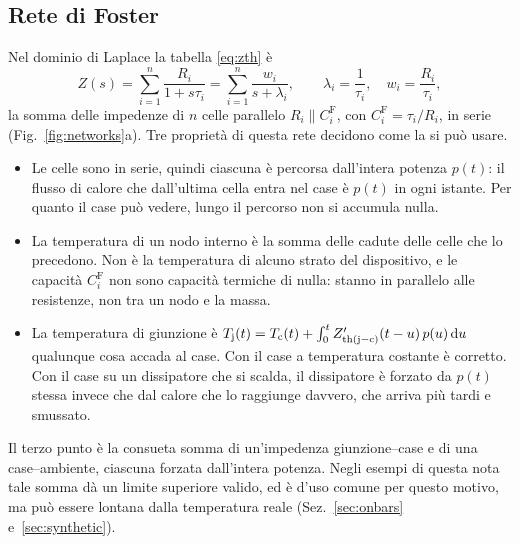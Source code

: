 \documentclass[10pt,a4paper]{scrartcl}
\let\newcommand\fcitdefine
\newcommand{\Zjc}{Z_\mathrm{th(j-c)}}
\newcommand{\Tj}{T_\mathrm{j}}
\newcommand{\Tc}{T_\mathrm{c}}
\newcommand{\diff}{\mathrm{d}}
\begin{document}
\subsection{Rete di Foster}
Nel dominio di Laplace la tabella \eqref{eq:zth} è
\begin{equation}
Z(s) = \sum_{i=1}^{n} \frac{R_i}{1 + s\tau_i} = \sum_{i=1}^{n} \frac{w_i}{s + \lambda_i} , \qquad \lambda_i = \frac{1}{\tau_i} , \quad w_i = \frac{R_i}{\tau_i} ,
\label{eq:zfoster}
\end{equation}
la somma delle impedenze di $n$ celle parallelo $R_i \parallel C_i^\mathrm{F}$, con $C_i^\mathrm{F} = \tau_i/R_i$, in serie (Fig.~\ref{fig:networks}a). Tre proprietà di questa rete decidono come la si può usare.
\begin{itemize}
\item Le celle sono in serie, quindi ciascuna è percorsa dall'intera potenza $p(t)$: il flusso di calore che dall'ultima cella entra nel case è $p(t)$ in ogni istante. Per quanto il case può vedere, lungo il percorso non si accumula nulla.
\item La temperatura di un nodo interno è la somma delle cadute delle celle che lo precedono. Non è la temperatura di alcuno strato del dispositivo, e le capacità $C_i^\mathrm{F}$ non sono capacità termiche di nulla: stanno in parallelo alle resistenze, non tra un nodo e la massa.
\item La temperatura di giunzione è $\Tj(t) = \Tc(t) + \int_0^t \Zjc'(t-u)\,p(u)\,\diff u$ qualunque cosa accada al case. Con il case a temperatura costante è corretto. Con il case su un dissipatore che si scalda, il dissipatore è forzato da $p(t)$ stessa invece che dal calore che lo raggiunge davvero, che arriva più tardi e smussato.
\end{itemize}
Il terzo punto è la consueta somma di un'impedenza giunzione--case e di una case--ambiente, ciascuna forzata dall'intera potenza. Negli esempi di questa nota tale somma dà un limite superiore valido, ed è d'uso comune per questo motivo, ma può essere lontana dalla temperatura reale (Sez.~\ref{sec:onbars} e~\ref{sec:synthetic}).
\end{document}
